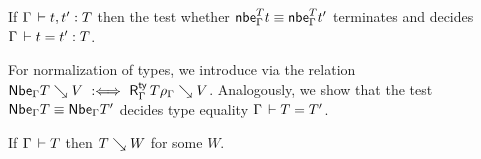 \documentclass[acmlarge,review,anonymous]{acmart}\settopmatter{printfolios=true}
\newcommand{\LONGVERSION}[1]{}
\begin{document}
\begin{corollary}
  If\/ $\Gamma \,\vdash t,t' : T$ then the test whether $\mathsf{nbe}_{\Gamma}^{T} t \equiv \mathsf{nbe}_{\Gamma}^{T}{t'}$
  terminates and
  decides $\Gamma \,\vdash t = t' : T$.
\end{corollary}
\LONGVERSION{
\begin{proof}
  Follows directly from soundness (which includes termination) and completeness of NbE.
\end{proof}
} %
For normalization of types, we introduce 
via the relation $\mathsf{Nbe}_{\Gamma} T \searrow V \mathrel{\ :\Longleftrightarrow\ } \mathsf{R}^{\mathsf{ty}}_{\Gamma} \, T\rho_\Gamma \searrow V$.
Analogously, we show that the test $\mathsf{Nbe}_{\Gamma} T \equiv \mathsf{Nbe}_{\Gamma} T'$
decides type equality $\Gamma \,\vdash T = T'$.

\begin{corollary}
  If\/ $\Gamma \,\vdash T$ then $T \evalsto W$ for some $W$.
\end{corollary}
\LONGVERSION{
\begin{proof}
  By the fundamental theorem of typing, $\RG \Gamma T {T\rhog}$,
  which implies $T \evalsto W$ by definition of the logical relation.
\end{proof}
} %
\end{document}
